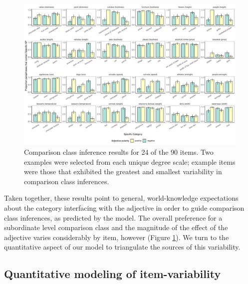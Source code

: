 \documentclass[doc, floatsintext]{apa6}
\newcommand{\ndg}[1]{\textcolor{Green}{[ndg: #1]}}
\begin{document}


\begin{figure}[t!]
\centering
\includegraphics[width=\textwidth]{figs/bars_cc_finalExpt_prereg_byItem.pdf}
\caption{Comparison class inference results for 24 of the 90 items. Two examples were selected from each unique degree scale; example items were those that exhibited the greatest and smallest variability in comparison class inferences.}\label{fig:ccInferenceItems}
\end{figure}


Taken together, these results point to general, world-knowledge expectations about the category interfacing with the adjective in order to guide comparison class inferences, as predicted by the model.
The overall preference for a subordinate level comparison class and the magnitude of the effect of the adjective varies considerably by item, however (Figure \ref{fig:ccInferenceItems}).
We turn to the quantitative aspect of our model to triangulate the sources of this variability.

\subsection{Quantitative modeling of item-variability}

\end{document}
